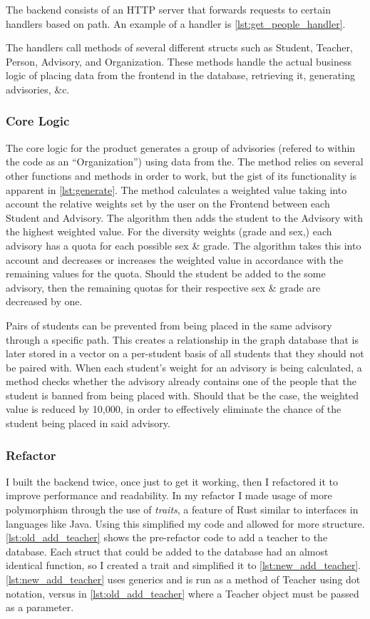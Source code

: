\documentclass{paper}
\begin{document}
The backend consists of an HTTP server that forwards requests to certain handlers based on path.
An example of a handler is \cref{lst:get_people_handler}.



The handlers call methods of several different structs such as Student, Teacher, Person, Advisory, and Organization.
These methods handle the actual business logic of placing data from the frontend in the database, retrieving it, generating advisories, \&c.

\subsubsection{Core Logic}
The core logic for the product generates a group of advisories (refered to within the code as an \enquote{Organization}) using data from the.
The method relies on several other functions and methods in order to work, but the gist of its functionality is apparent in \cref{lst:generate}.
The method calculates a weighted value taking into account the relative weights set by the user on the Frontend between each Student and Advisory.
The algorithm then adds the student to the Advisory with the highest weighted value.
For the diversity weights (grade and sex,) each advisory has a quota for each possible sex \& grade.
The algorithm takes this into account and decreases or increases the weighted value in accordance with the remaining values for the quota.
Should the student be added to the some advisory, then the remaining quotas for their respective sex \& grade are decreased by one.

Pairs of students can be prevented from being placed in the same advisory through a specific path.
This creates a relationship in the graph database that is later stored in a vector on a per-student basis of all students that they should not be paired with.
When each student's weight for an advisory is being calculated, a method checks whether the advisory already contains one of the people that the student is banned from being placed with.
Should that be the case, the weighted value is reduced by 10,000, in order to effectively eliminate the chance of the student being placed in said advisory.



\subsubsection{Refactor}
I built the backend twice, once just to get it working, then I refactored it to improve performance and readability.
In my refactor I made usage of more polymorphism through the use of \emph{traits}, a feature of Rust similar to interfaces in languages like Java.
Using this simplified my code and allowed for more structure.
\cref{lst:old_add_teacher} shows the pre-refactor code to add a teacher to the database.
Each struct that could be added to the database had an almost identical function, so I created a trait and simplified it to \cref{lst:new_add_teacher}.
\cref{lst:new_add_teacher} uses generics and is run as a method of Teacher using dot notation, versus in \cref{lst:old_add_teacher} where a Teacher object must be passed as a parameter.
\end{document}
